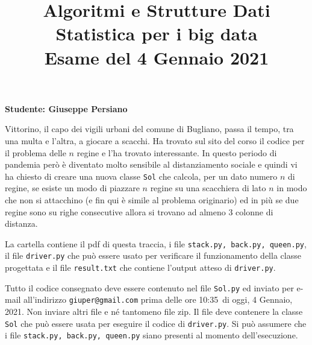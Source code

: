 \documentclass{amsart}
\begin{document}
\title{Algoritmi e Strutture Dati\\
Statistica per i big data\\
Esame del 4 Gennaio 2021
}


\newcommand{\NomeStudente}{Giuseppe Persiano}
\newcommand{\nomeClasse}{{\tt{Sol}}}
\newcommand{\nomeMetodo}{{\tt{nuovo}}}
\newcommand{\oraconsegna}{10:35}
\newcommand{\dataoggi}{4 Gennaio, 2021}


\maketitle

\hfill{{\bf Studente: \NomeStudente}}

\smallskip
Vittorino, il capo dei vigili urbani del comune di Bugliano, passa il tempo,
tra una multa e l'altra, a giocare a scacchi. Ha trovato sul sito del corso
il codice per il problema delle $n$ regine e l'ha trovato interessante.
In questo periodo di pandemia per\`o \`e diventato molto sensibile al 
distanziamento sociale e quindi vi ha chiesto di creare
una nuova classe {\nomeClasse} che calcola, per un dato numero 
$n$ di regine, se esiste un modo di piazzare $n$ regine  su una scacchiera 
di lato $n$ in modo che non si attacchino (e fin qui \`e simile al problema 
originario) ed in pi\`u se due regine sono su righe consecutive allora si trovano
ad almeno $3$ colonne di distanza.

\medskip{}
La cartella contiene il pdf di questa traccia, i file
{\tt stack.py, back.py, queen.py},
il file {\tt driver.py} che pu\`o essere usato
per verificare il funzionamento della classe progettata
e il file  {\tt result.txt} che contiene l'output atteso di {\tt driver.py}.

\medskip{}
Tutto il codice consegnato deve essere contenuto nel file
{\tt \nomeClasse .py} ed inviato per e-mail all'indirizzo
{\tt giuper@gmail.com} prima delle ore \oraconsegna\ di oggi, 
\dataoggi. Non inviare altri file e n\'e tantomeno file zip.
Il file deve contenere la classe {\tt \nomeClasse}  
che pu\`o essere usata per eseguire
il codice di {\tt driver.py}. Si pu\`o assumere che i file
{\tt stack.py, back.py, queen.py}  
siano presenti al momento dell'esecuzione. 
\end{document}

